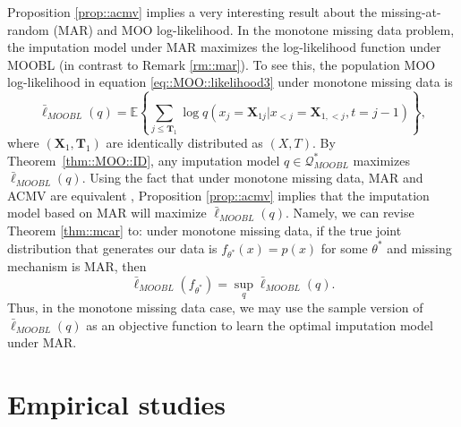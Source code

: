 \documentclass[aos, preprint]{imsart}
\theoremstyle{plain}
\theoremstyle{definition}
\newcommand{\E}{\mbox{$\mathbb{E}$}}
\newcommand{\bX}{\mathbf{X}}
\newcommand{\bT}{\mathbf{T}}
\begin{document}
Proposition \ref{prop::acmv} implies a very interesting result about the missing-at-random (MAR) and MOO
log-likelihood. In the monotone missing data problem,
the imputation model under MAR maximizes the log-likelihood function under MOOBL (in contrast to Remark \ref{rm::mar}).
To see this,
the population MOO log-likelihood in equation \eqref{eq::MOO::likelihood3} 
under monotone missing data is
\begin{equation*}
\bar \ell_{MOOBL}(q)=  \E\left\{\sum_{j \leq \bT_1} \log q(x_j = \bX_{1j}|x_{<j} = \bX_{1, <j}, t = j-1)\right\},
\end{equation*}
where $(\bX_1,\bT_1)$ are identically distributed as $(X,T)$.
By Theorem~\ref{thm::MOO::ID}, any imputation model $q\in \mathcal{Q}^*_{MOOBL}$
maximizes $\bar \ell_{MOOBL}(q)$.
Using the fact that under monotone missing data, MAR and ACMV are equivalent \citep{molenberghs1998monotone},
Proposition \ref{prop::acmv} implies that the imputation model based on MAR
will maximize $\bar \ell_{MOOBL}(q)$. Namely, we can revise Theorem \ref{thm::mcar} to:  
under monotone missing data,
if the true joint distribution that generates our data is $f_{\theta^*}(x) = p(x)$ for some $\theta^*$ and missing mechanism is MAR,
then 
\begin{equation}
\bar \ell_{MOOBL}(f_{\theta^*}) = \sup_q\bar \ell_{MOOBL}(q).
\label{eq:MOOBL2}
\end{equation}
Thus, in the monotone missing data case,
we may use the sample version of $\bar \ell_{MOOBL}(q)$  as an objective function 
to learn the optimal imputation model under MAR. 


\section{Empirical studies}\label{sec::empirical}

\end{document}
